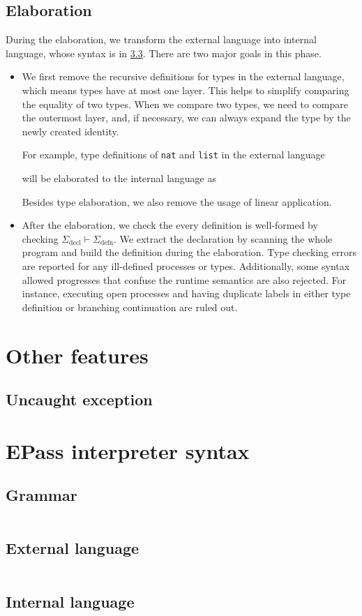 \documentclass[12pt, openany]{memoir}
\begin{document}
\section{Elaboration}
During the elaboration, we transform the external language into internal language, whose syntax is in \cref{sec:il}. There are two major goals in this phase.
\begin{itemize}
  \item We first remove the recursive definitions for types in the external language, which means types have at most one layer.
  This helps to simplify comparing the equality of two types. When we compare two types, we need to compare the outermost layer,
  and, if necessary, we can always expand the type by the newly created identity.

  For example, type definitions of \texttt{nat} and \texttt{list} in the external language 
  
  will be elaborated to the internal language as
  
  Besides type elaboration, we also remove the usage of linear application.
  \item After the elaboration, we check the every definition is well-formed by checking $\Sigma_\text{decl} \vdash \Sigma_\text{defn}$.
  We extract the declaration by scanning the whole program and build the definition during the elaboration.
  Type checking errors are reported for any ill-defined processes or types. 
  Additionally, some syntax allowed progresses that confuse the runtime semantics are also rejected.
  For instance, executing open processes and having duplicate labels in either type definition or branching continuation are ruled out.
\end{itemize}
\chapter{Other features}
\section{Uncaught exception}
\appendix
\chapter{EPass interpreter syntax} 
\section{Grammar} \label{sec:grammar}
\inputminted{text}{code/grammar.txt}
\section{External language} \label{sec:el}
\inputminted{ocaml}{code/el.ml}
\section{Internal language} \label{sec:il}
\inputminted{ocaml}{code/il.ml}
\backmatter

\printbibliography
\end{document}
